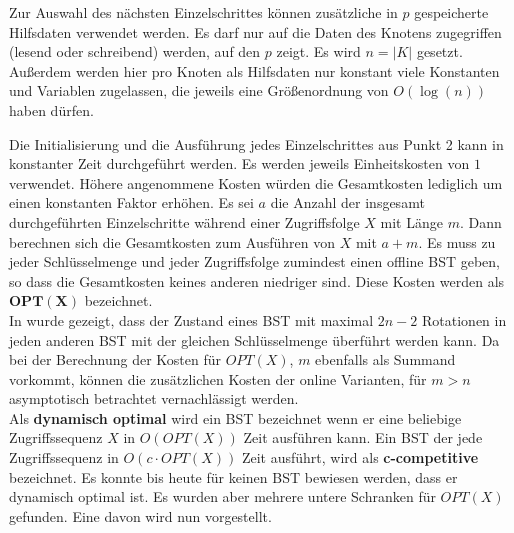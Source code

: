 \documentclass[a4paper,12pt]{article}
\begin{document}
\noindent 	Zur Auswahl des nächsten Einzelschrittes können zusätzliche in $p$ gespeicherte Hilfsdaten verwendet werden. Es darf nur auf die Daten des Knotens zugegriffen (lesend oder schreibend) werden, auf den $p$ zeigt. Es wird $n = \vert K \vert$ gesetzt. Außerdem werden hier pro Knoten als Hilfsdaten nur konstant viele Konstanten und Variablen zugelassen, die jeweils eine Größenordnung von $O\left(\log \left(n\right)\right)$  haben dürfen.

\noindent Die Initialisierung und die Ausführung jedes Einzelschrittes aus Punkt 2 kann in konstanter Zeit durchgeführt werden. Es werden jeweils Einheitskosten von $1$ verwendet. Höhere angenommene Kosten würden die Gesamtkosten lediglich um einen konstanten Faktor erhöhen. Es sei $a$ die Anzahl der insgesamt durchgeführten Einzelschritte während einer Zugriffsfolge $X$ mit Länge $m$. Dann berechnen sich die Gesamtkosten zum Ausführen von $X$ mit $a + m$. Es muss zu jeder Schlüsselmenge und jeder Zugriffsfolge zumindest einen offline BST geben, so dass die Gesamtkosten keines anderen niedriger sind. Diese Kosten werden als $\mathbf{OPT\left(X\right)}$ bezeichnet.\\  In \cite{nRotations} wurde gezeigt, dass der Zustand eines BST mit maximal $2n -2$ Rotationen in jeden anderen BST mit der gleichen Schlüsselmenge überführt werden kann. Da bei der Berechnung der Kosten für  $\mathit{OPT(X)}$, $m$ ebenfalls als Summand vorkommt, können die zusätzlichen Kosten der online Varianten, für $m > n$ asymptotisch betrachtet vernachlässigt werden. \\
\noindent Als \textbf{dynamisch optimal } wird ein BST bezeichnet wenn er eine beliebige Zugriffssequenz $X$ in $O\left(\mathit{OPT}\left(X\right)\right)$ Zeit ausführen kann. Ein BST der jede Zugriffssequenz in $O\left(c \cdot \mathit{OPT}\left(X\right)\right)$ Zeit ausführt, wird als \textbf{c-competitive} bezeichnet. Es konnte bis heute für keinen BST bewiesen werden, dass er dynamisch optimal ist. Es wurden aber mehrere untere Schranken für $\mathit{OPT}\left(X\right)$ gefunden. Eine davon wird  nun vorgestellt.
\end{document}
